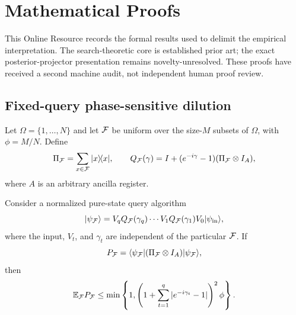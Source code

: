 \section{Mathematical Proofs}
\label{app:theory}

This Online Resource records the formal results used to delimit the empirical
interpretation. The search-theoretic core is established prior art; the exact
posterior-projector presentation remains novelty-unresolved. These proofs have
received a second machine audit, not independent human proof review.

\subsection{Fixed-query phase-sensitive dilution}

Let $\Omega=\{1,\ldots,N\}$ and let $\mathcal{F}$ be uniform over the size-$M$
subsets of $\Omega$, with $\phi=M/N$. Define
\begin{equation}
  \Pi_{\mathcal{F}}=\sum_{x\in\mathcal{F}}|x\rangle\!\langle x|,
  \qquad
  Q_{\mathcal{F}}(\gamma)
  =I+(e^{-i\gamma}-1)(\Pi_{\mathcal{F}}\otimes I_A),
\end{equation}
where $A$ is an arbitrary ancilla register.

\begin{theorem}
Consider a normalized pure-state query algorithm
\begin{equation}
 |\psi_{\mathcal{F}}\rangle=
 V_qQ_{\mathcal{F}}(\gamma_q)\cdots V_1Q_{\mathcal{F}}(\gamma_1)
 V_0|\psi_{\mathrm{in}}\rangle,
 \label{eq:fixed-query-algorithm}
\end{equation}
where the input, $V_t$, and $\gamma_t$ are independent of the particular
$\mathcal{F}$. If
\begin{equation}
 P_{\mathcal{F}}=\langle\psi_{\mathcal{F}}|(\Pi_{\mathcal{F}}\otimes I_A)|\psi_{\mathcal{F}}\rangle,
\end{equation}
then
\begin{equation}
 \mathbb{E}_{\mathcal{F}}P_{\mathcal{F}}
 \leq
 \min\left\{1,
 \left(1+\sum_{t=1}^{q}|e^{-i\gamma_t}-1|\right)^2\phi
 \right\}.
 \label{eq:phase-sensitive-bound}
\end{equation}
\label{thm:phase-sensitive}
\end{theorem}

